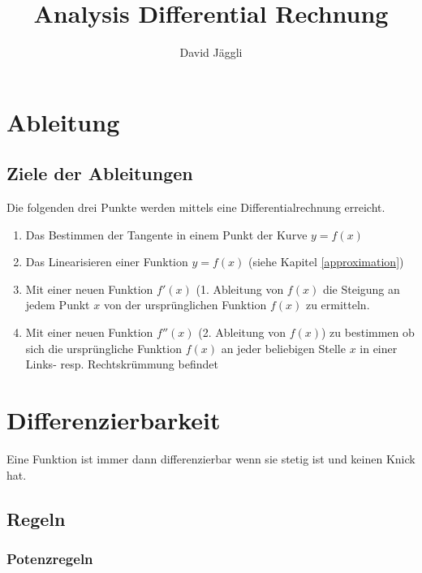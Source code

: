 \documentclass[12pt]{scrartcl}
\author{David Jäggli}
\title{Analysis Differential Rechnung}
\begin{document}
\maketitle

\tableofcontents

\newpage


\section{Ableitung} 
\subsection{Ziele der Ableitungen}

Die folgenden drei Punkte werden mittels eine Differentialrechnung erreicht.

\begin{enumerate}
    \item Das Bestimmen der Tangente in einem Punkt der Kurve $y=f(x)$
    \item Das Linearisieren einer Funktion $y=f(x)$ (siehe Kapitel \ref{approximation})
    \item Mit einer neuen Funktion $f'(x)$ (1. Ableitung von $f(x)$ die Steigung an jedem Punkt $x$ von der ursprünglichen Funktion $f(x)$ zu ermitteln.
    \item Mit einer neuen Funktion $f''(x)$ (2. Ableitung von $f(x)$) zu bestimmen ob sich die ursprüngliche Funktion $f(x)$ an jeder beliebigen Stelle $x$ in einer Links- resp. Rechtskrümmung befindet
\end{enumerate}


\section{Differenzierbarkeit}
Eine Funktion ist immer dann differenzierbar wenn sie stetig ist und keinen Knick 
hat.

\subsection{Regeln}
\subsubsection{Potenzregeln}
\end{document}
